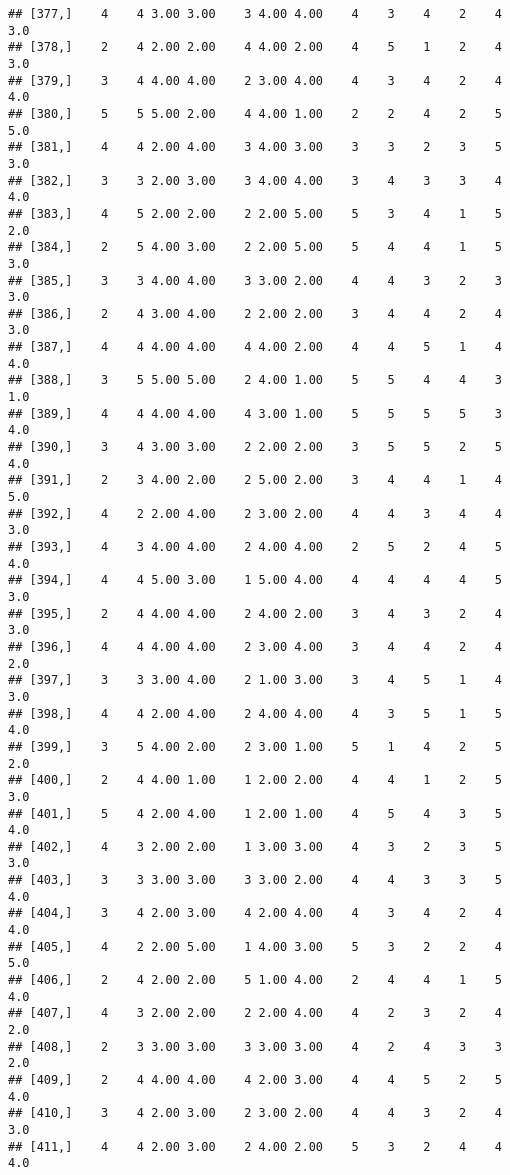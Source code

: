 \documentclass[]{article}
\begin{document}
\begin{verbatim}
## [377,]    4    4 3.00 3.00    3 4.00 4.00    4    3    4    2    4  3.0
## [378,]    2    4 2.00 2.00    4 4.00 2.00    4    5    1    2    4  3.0
## [379,]    3    4 4.00 4.00    2 3.00 4.00    4    3    4    2    4  4.0
## [380,]    5    5 5.00 2.00    4 4.00 1.00    2    2    4    2    5  5.0
## [381,]    4    4 2.00 4.00    3 4.00 3.00    3    3    2    3    5  3.0
## [382,]    3    3 2.00 3.00    3 4.00 4.00    3    4    3    3    4  4.0
## [383,]    4    5 2.00 2.00    2 2.00 5.00    5    3    4    1    5  2.0
## [384,]    2    5 4.00 3.00    2 2.00 5.00    5    4    4    1    5  3.0
## [385,]    3    3 4.00 4.00    3 3.00 2.00    4    4    3    2    3  3.0
## [386,]    2    4 3.00 4.00    2 2.00 2.00    3    4    4    2    4  3.0
## [387,]    4    4 4.00 4.00    4 4.00 2.00    4    4    5    1    4  4.0
## [388,]    3    5 5.00 5.00    2 4.00 1.00    5    5    4    4    3  1.0
## [389,]    4    4 4.00 4.00    4 3.00 1.00    5    5    5    5    3  4.0
## [390,]    3    4 3.00 3.00    2 2.00 2.00    3    5    5    2    5  4.0
## [391,]    2    3 4.00 2.00    2 5.00 2.00    3    4    4    1    4  5.0
## [392,]    4    2 2.00 4.00    2 3.00 2.00    4    4    3    4    4  3.0
## [393,]    4    3 4.00 4.00    2 4.00 4.00    2    5    2    4    5  4.0
## [394,]    4    4 5.00 3.00    1 5.00 4.00    4    4    4    4    5  3.0
## [395,]    2    4 4.00 4.00    2 4.00 2.00    3    4    3    2    4  3.0
## [396,]    4    4 4.00 4.00    2 3.00 4.00    3    4    4    2    4  2.0
## [397,]    3    3 3.00 4.00    2 1.00 3.00    3    4    5    1    4  3.0
## [398,]    4    4 2.00 4.00    2 4.00 4.00    4    3    5    1    5  4.0
## [399,]    3    5 4.00 2.00    2 3.00 1.00    5    1    4    2    5  2.0
## [400,]    2    4 4.00 1.00    1 2.00 2.00    4    4    1    2    5  3.0
## [401,]    5    4 2.00 4.00    1 2.00 1.00    4    5    4    3    5  4.0
## [402,]    4    3 2.00 2.00    1 3.00 3.00    4    3    2    3    5  3.0
## [403,]    3    3 3.00 3.00    3 3.00 2.00    4    4    3    3    5  4.0
## [404,]    3    4 2.00 3.00    4 2.00 4.00    4    3    4    2    4  4.0
## [405,]    4    2 2.00 5.00    1 4.00 3.00    5    3    2    2    4  5.0
## [406,]    2    4 2.00 2.00    5 1.00 4.00    2    4    4    1    5  4.0
## [407,]    4    3 2.00 2.00    2 2.00 4.00    4    2    3    2    4  2.0
## [408,]    2    3 3.00 3.00    3 3.00 3.00    4    2    4    3    3  2.0
## [409,]    2    4 4.00 4.00    4 2.00 3.00    4    4    5    2    5  4.0
## [410,]    3    4 2.00 3.00    2 3.00 2.00    4    4    3    2    4  3.0
## [411,]    4    4 2.00 3.00    2 4.00 2.00    5    3    2    4    4  4.0

\end{verbatim}
\end{document}
